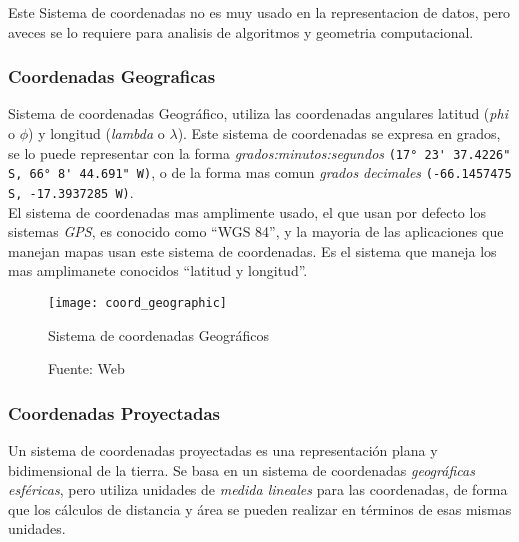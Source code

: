         Este Sistema de coordenadas no es muy usado en la representacion de datos, pero aveces se lo requiere para analisis de algoritmos y geometria computacional.

      \subsubsection{Coordenadas Geograficas} %
      \label{subs:coordenadas_geograficas}
        Sistema de coordenadas Geográfico, utiliza las coordenadas angulares latitud  (\emph{phi} o ${\phi}$) y longitud (\emph{lambda} o ${\lambda}$). Este sistema de coordenadas se expresa en grados, se lo puede representar con la forma \emph{grados:minutos:segundos }\verb|(17° 23' 37.4226" S, 66° 8' 44.691" W)|, o de la forma mas comun \emph{grados decimales} \verb|(-66.1457475 S, -17.3937285 W)|.\\

        El sistema de coordenadas  mas amplimente usado, el que usan por defecto los sistemas \emph{GPS}, es conocido como ``WGS 84'', y la mayoria de las aplicaciones que manejan mapas usan este sistema de coordenadas. Es el sistema que maneja los mas amplimanete conocidos ``latitud y longitud''.\\

        \begin{figure}[H]
          \begin{center}
            \texttt{[image: coord\_geographic]}
            \caption{Sistema de coordenadas Geográficos}
            \label{fig:coord_geographic}
            \caption*{Fuente: Web}
          \end{center}

        \end{figure}


      \subsubsection{Coordenadas Proyectadas} %
      \label{subs:coordenadas_proyectadas}
        Un sistema de coordenadas proyectadas es una representación plana y bidimensional de la  tierra. Se basa en un sistema de coordenadas \emph{geográficas esf\'ericas}, pero utiliza unidades de \emph{medida lineales} para las coordenadas, de forma que los cálculos de distancia y área se pueden realizar en términos de esas mismas unidades.\cite{projected} \\

